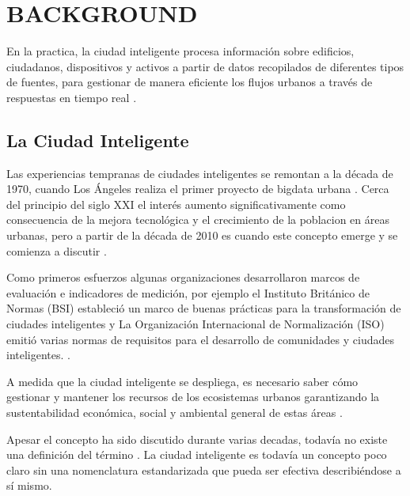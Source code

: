 \documentclass[a4paper,fleqn,spanish]{cas-dc}
\begin{document}
\section{BACKGROUND}\label{marco}


En la practica, la ciudad inteligente procesa información sobre edificios,
ciudadanos, dispositivos y activos a partir de datos recopilados de diferentes
tipos de fuentes, para gestionar de manera eficiente los flujos urbanos a
través de respuestas en tiempo real \cite{stubinger_understanding_2020}. 

\subsection{La Ciudad Inteligente}\label{concepto}

Las experiencias tempranas de ciudades inteligentes se remontan a la década
de 1970, cuando Los Ángeles realiza el primer proyecto de bigdata urbana \cite{stubinger_understanding_2020}.
Cerca del principio del siglo XXI
el interés aumento significativamente como consecuencia de la mejora
tecnológica y el crecimiento de la poblacion en áreas urbanas,
pero a partir de la década de 2010 es cuando este concepto emerge y se comienza a discutir
.

Como primeros esfuerzos 
algunas organizaciones 
desarrollaron marcos de evaluación e indicadores de medición,
por ejemplo
el Instituto Británico de Normas
(BSI) estableció
un marco de buenas prácticas para la
transformación de ciudades inteligentes
y
La Organización Internacional de Normalización (ISO) emitió
varias normas de requisitos para el desarrollo de comunidades y
ciudades inteligentes.
\cite{aljowder_systematic_2019}.

A medida que
la ciudad inteligente se despliega, es necesario saber cómo
gestionar y mantener los recursos de los ecosistemas urbanos
\cite{aljowder_systematic_2019} garantizando la sustentabilidad económica,
social y ambiental general de estas áreas \cite{stubinger_understanding_2020}.

Apesar el concepto ha sido discutido durante varias decadas,
todavía no existe una definición del término
\cite{wahab_systematic_2020}.
La ciudad inteligente es todavía un
concepto poco claro sin una nomenclatura estandarizada que pueda ser
efectiva describiéndose a sí mismo.
\end{document}

